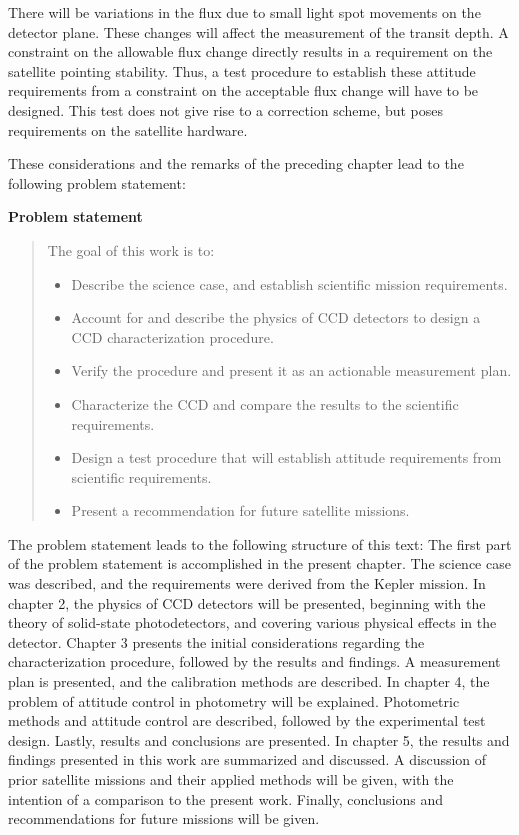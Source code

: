 \documentclass[../main.tex]{subfiles}
\begin{document}
	There will be variations in the flux due to small light spot movements on the detector plane. These changes will affect the measurement of the transit depth. A constraint on the allowable flux change directly results in a requirement on the satellite pointing stability. Thus, a test procedure to establish these attitude requirements from a constraint on the acceptable flux change will have to be designed. This test does not give rise to a correction scheme, but poses requirements on the satellite hardware.
	
	These considerations and the remarks of the preceding chapter lead to the following problem statement:
	\begin{tcolorbox}[colframe = white, sharpish corners]
		\textbf{Problem statement}
		\begin{quote}
			The goal of this work is to: 
			\begin{itemize}
				\item Describe the science case, and establish scientific mission requirements. 
				\item Account for and describe the physics of CCD detectors to design a CCD characterization procedure. 
				\item Verify the procedure and present it as an actionable measurement plan. 
				\item Characterize the CCD and compare the results to the scientific requirements. 
				\item Design a test procedure that will establish attitude requirements from scientific requirements. 
				\item Present a recommendation for future satellite missions.
			\end{itemize}
		\end{quote}
	\end{tcolorbox}
	\noindent The problem statement leads to the following structure of this text: The first part of the problem statement is accomplished in the present chapter. The science case was described, and the requirements were derived from the Kepler mission. In chapter 2, the physics of CCD detectors will be presented, beginning with the theory of solid-state photodetectors, and covering various physical effects in the detector. Chapter 3 presents the initial considerations regarding the characterization procedure, followed by the results and findings. A measurement plan is presented, and the calibration methods are described. In chapter 4, the problem of attitude control in photometry will be explained. Photometric methods and attitude control are described, followed by the experimental test design. Lastly, results and conclusions are presented. In chapter 5, the results and findings presented in this work are summarized and discussed. A discussion of prior satellite missions and their applied methods will be given, with the intention of a comparison to the present work. Finally, conclusions and recommendations for future missions will be given.
	
\end{document}
